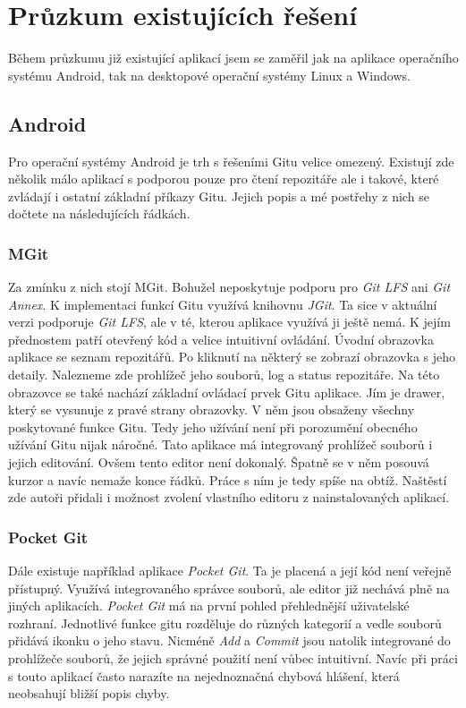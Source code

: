 \section{Průzkum existujících řešení}
Během průzkumu již existující aplikací jsem se zaměřil jak na aplikace operačního systému Android, tak na desktopové operační systémy Linux a Windows.

    \subsection {Android}
    Pro operační systémy Android je trh s řešeními Gitu velice omezený. Existují zde několik málo aplikací s podporou pouze pro čtení repozitáře ale i takové, které zvládají i ostatní základní příkazy Gitu. Jejich popis a mé postřehy z nich se dočtete na následujících řádkách.

    \subsubsection{MGit}
    Za zmínku z nich stojí MGit. Bohužel neposkytuje podporu pro \emph{Git LFS} ani \emph{Git Annex}. K implementaci funkcí Gitu využívá knihovnu \emph{JGit}. Ta sice v aktuální verzi podporuje \emph{Git LFS}, ale v té, kterou aplikace využívá ji ještě nemá. K jejím přednostem patří otevřený kód a velice intuitivní ovládání.
    Úvodní obrazovka aplikace se seznam repozitářů. Po kliknutí na některý se zobrazí obrazovka s jeho detaily. Nalezneme zde prohlížeč jeho souborů, log a status repozitáře. Na této obrazovce se také nachází základní ovládací prvek Gitu aplikace. Jím je drawer, který se vysunuje z pravé strany obrazovky. V něm jsou obsaženy všechny poskytované funkce Gitu. Tedy jeho užívání není při porozumění obecného užívání Gitu nijak náročné. Tato aplikace má integrovaný prohlížeč souborů i jejich editování. Ovšem tento editor není dokonalý. Špatně se v něm posouvá kurzor a navíc nemaže konce řádků. Práce s ním je tedy spíše na obtíž. Naštěstí zde autoři přidali i možnost zvolení vlastního editoru z nainstalovaných aplikací.

    \subsubsection{Pocket Git}
    Dále existuje například aplikace \emph{Pocket Git}. Ta je placená a její kód není veřejně přístupný. Využívá integrovaného správce souborů, ale editor již nechává plně na jiných aplikacích. \emph{Pocket Git} má na první pohled přehlednější uživatelské rozhraní. Jednotlivé funkce gitu rozděluje do různých kategorií a vedle souborů přidává ikonku o jeho stavu. Nicméně \emph{Add} a \emph{Commit} jsou natolik integrované do prohlížeče souborů, že jejich správné použití není vůbec intuitivní. Navíc při práci s touto aplikací často narazíte na nejednoznačná chybová hlášení, která neobsahují bližší popis chyby.


